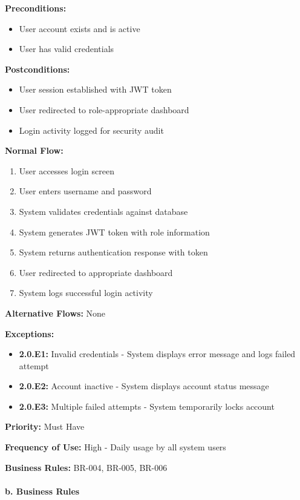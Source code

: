 \documentclass[12pt,a4paper]{article}
\begin{document}
\textbf{Preconditions:}
\begin{itemize}
    \item User account exists and is active
    \item User has valid credentials
\end{itemize}

\textbf{Postconditions:}
\begin{itemize}
    \item User session established with JWT token
    \item User redirected to role-appropriate dashboard
    \item Login activity logged for security audit
\end{itemize}

\textbf{Normal Flow:}
\begin{enumerate}
    \item User accesses login screen
    \item User enters username and password
    \item System validates credentials against database
    \item System generates JWT token with role information
    \item System returns authentication response with token
    \item User redirected to appropriate dashboard
    \item System logs successful login activity
\end{enumerate}

\textbf{Alternative Flows:} None

\textbf{Exceptions:}
\begin{itemize}
    \item \textbf{2.0.E1:} Invalid credentials - System displays error message and logs failed attempt
    \item \textbf{2.0.E2:} Account inactive - System displays account status message
    \item \textbf{2.0.E3:} Multiple failed attempts - System temporarily locks account
\end{itemize}

\textbf{Priority:} Must Have

\textbf{Frequency of Use:} High - Daily usage by all system users

\textbf{Business Rules:} BR-004, BR-005, BR-006

\paragraph{b. Business Rules}
\end{document}
